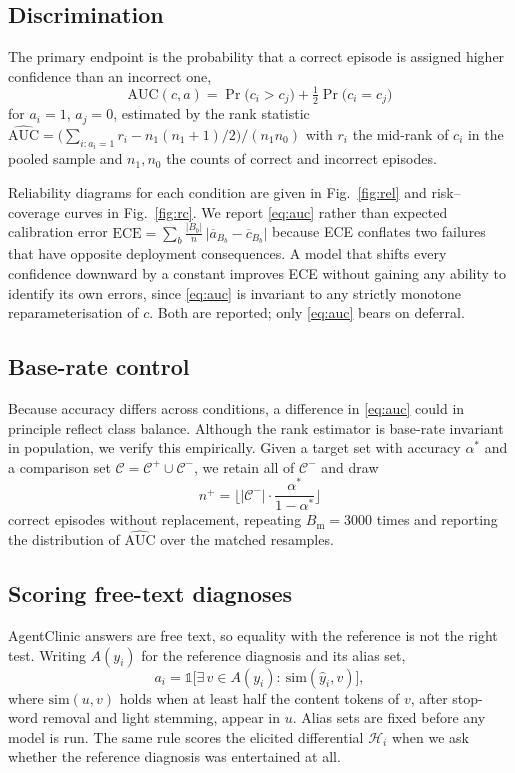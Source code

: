 \documentclass[journal,twoside]{IEEEtran}
\begin{document}
\subsection{Discrimination}
The primary endpoint is the probability that a correct episode is assigned higher confidence than an
incorrect one,
\begin{equation}
\mathrm{AUC}(c,a)=\Pr\big(c_i > c_j\big) + \tfrac{1}{2}\Pr\big(c_i = c_j\big)
\label{eq:auc}
\end{equation}
for $a_i=1$, $a_j=0$, estimated by the rank statistic
$\widehat{\mathrm{AUC}} = \big(\sum_{i:a_i=1} r_i - n_1(n_1+1)/2\big) / (n_1 n_0)$ with $r_i$ the
mid-rank of $c_i$ in the pooled sample and $n_1,n_0$ the counts of correct and incorrect episodes.

Reliability diagrams for each condition are given in Fig.~\ref{fig:rel} and risk--coverage
curves in Fig.~\ref{fig:rc}. We report \eqref{eq:auc} rather than expected calibration error
$\mathrm{ECE}=\sum_b \frac{|B_b|}{n}\,\big|\overline{a}_{B_b}-\overline{c}_{B_b}\big|$
because ECE conflates two failures that have opposite deployment consequences. A model that shifts
every confidence downward by a constant improves ECE without gaining any ability to identify its own
errors, since \eqref{eq:auc} is invariant to any strictly monotone reparameterisation of $c$. Both
are reported; only \eqref{eq:auc} bears on deferral.

\subsection{Base-rate control}
Because accuracy differs across conditions, a difference in \eqref{eq:auc} could in principle reflect
class balance. Although the rank estimator is base-rate invariant in population, we verify this
empirically. Given a target set with accuracy $\alpha^{\ast}$ and a comparison set
$\mathcal{C}=\mathcal{C}^{+}\cup\mathcal{C}^{-}$, we retain all of $\mathcal{C}^{-}$ and draw
\begin{equation}
n^{+} = \Big\lfloor |\mathcal{C}^{-}| \cdot \frac{\alpha^{\ast}}{1-\alpha^{\ast}} \Big\rfloor
\label{eq:match}
\end{equation}
correct episodes without replacement, repeating $B_{\mathrm{m}}=3000$ times and reporting the
distribution of $\widehat{\mathrm{AUC}}$ over the matched resamples.

\subsection{Scoring free-text diagnoses}
AgentClinic answers are free text, so equality with the reference is not the right test. Writing
$A(y_i)$ for the reference diagnosis and its alias set,
\begin{equation}
a_i = \mathbb{1}\big[\exists\, v \in A(y_i):\ \mathrm{sim}(\hat{y}_i, v)\big],
\label{eq:hit}
\end{equation}
where $\mathrm{sim}(u,v)$ holds when at least half the content tokens of $v$, after stop-word removal
and light stemming, appear in $u$. Alias sets are fixed before any model is run. The same rule scores
the elicited differential $\mathcal{H}_i$ when we ask whether the reference diagnosis was entertained
at all.
\end{document}
